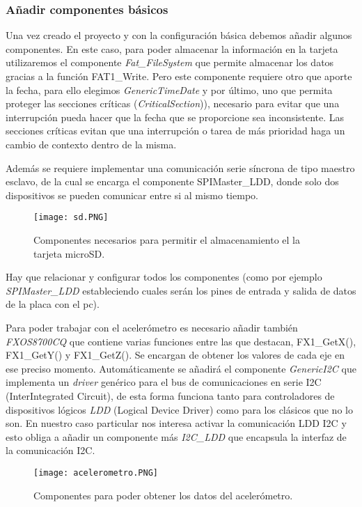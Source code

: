 \subsubsection{Añadir componentes básicos}
Una vez creado el proyecto y con la configuración básica debemos añadir algunos componentes. En este caso, para poder almacenar la información en la tarjeta utilizaremos el componente \textit{Fat\_FileSystem} que permite almacenar los datos gracias a la función FAT1\_Write. 
Pero este componente requiere otro que aporte la fecha, para ello elegimos \textit{GenericTimeDate} y por último, uno que permita proteger las secciones críticas (\textit{CriticalSection})), necesario para evitar que una interrupción pueda hacer que la fecha que se proporcione sea inconsistente. Las secciones críticas evitan que una interrupción o tarea de más prioridad haga un cambio de contexto dentro de la misma.

Además se requiere implementar una comunicación serie síncrona de tipo maestro esclavo, de la cual se encarga el componente SPIMaster\_LDD, donde solo dos dispositivos se pueden comunicar entre si al mismo tiempo.
\begin{figure}[!h]
	\centering
	\texttt{[image: sd.PNG]}
	\caption{Componentes necesarios para permitir el almacenamiento el la tarjeta microSD.}\label{fig:sd.PNG}
\end{figure}
\FloatBarrier

Hay que relacionar y configurar todos los componentes (como por ejemplo \textit{SPIMaster\_LDD} estableciendo cuales serán los pines de entrada y salida de datos de la placa con el pc).

Para poder trabajar con el acelerómetro es necesario añadir también \textit{FXOS8700CQ} que contiene varias funciones entre las que destacan, FX1\_GetX(), FX1\_GetY() y FX1\_GetZ(). Se encargan de obtener los valores de cada eje en ese preciso momento.
Automáticamente se añadirá el componente \textit{GenericI2C} que implementa un \textit{driver} genérico para el bus de comunicaciones en serie I2C (Inter\-Integrated Circuit), de esta forma funciona tanto para controladores de dispositivos lógicos \textit{LDD} (Logical Device Driver) como para los clásicos que no lo son. En nuestro caso particular nos interesa activar la comunicación LDD I2C y esto obliga a añadir un componente más \textit{I2C\_LDD} que encapsula la interfaz de la comunicación I2C.
\begin{figure}[!h]
	\centering
	\texttt{[image: acelerometro.PNG]}
	\caption{Componentes para poder obtener los datos del acelerómetro.}\label{fig:acelerometro.PNG}
\end{figure}
\FloatBarrier

